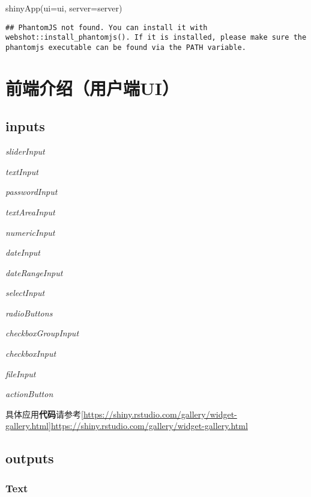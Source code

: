 \documentclass[
]{book}
\newenvironment{Shaded}{\begin{snugshade}}{\end{snugshade}}
\newcommand{\AttributeTok}[1]{\textcolor[rgb]{0.77,0.63,0.00}{#1}}
\newcommand{\FunctionTok}[1]{\textcolor[rgb]{0.00,0.00,0.00}{#1}}
\newcommand{\NormalTok}[1]{#1}
\begin{document}
\begin{Shaded}
\begin{Highlighting}[]
\FunctionTok{shinyApp}\NormalTok{(}\AttributeTok{ui=}\NormalTok{ui, }\AttributeTok{server=}\NormalTok{server)}
\end{Highlighting}
\end{Shaded}

\begin{verbatim}
## PhantomJS not found. You can install it with webshot::install_phantomjs(). If it is installed, please make sure the phantomjs executable can be found via the PATH variable.
\end{verbatim}

\hypertarget{ux524dux7aefux4ecbux7ecdux7528ux6237ux7aefui}{%
\section{前端介绍（用户端UI）}\label{ux524dux7aefux4ecbux7ecdux7528ux6237ux7aefui}}

\hypertarget{inputs}{%
\subsection{inputs}\label{inputs}}

\emph{sliderInput}

\emph{textInput}

\emph{passwordInput}

\emph{textAreaInput}

\emph{numericInput}

\emph{dateInput}

\emph{dateRangeInput}

\emph{selectInput}

\emph{radioButtons}

\emph{checkboxGroupInput}

\emph{checkboxInput}

\emph{fileInput}

\emph{actionButton}

具体应用\textbf{代码}请参考{[}\url{https://shiny.rstudio.com/gallery/widget-gallery.html}{]}\url{https://shiny.rstudio.com/gallery/widget-gallery.html}

\hypertarget{outputs}{%
\subsection{outputs}\label{outputs}}

\hypertarget{text}{%
\subsubsection{Text}\label{text}}
\end{document}
